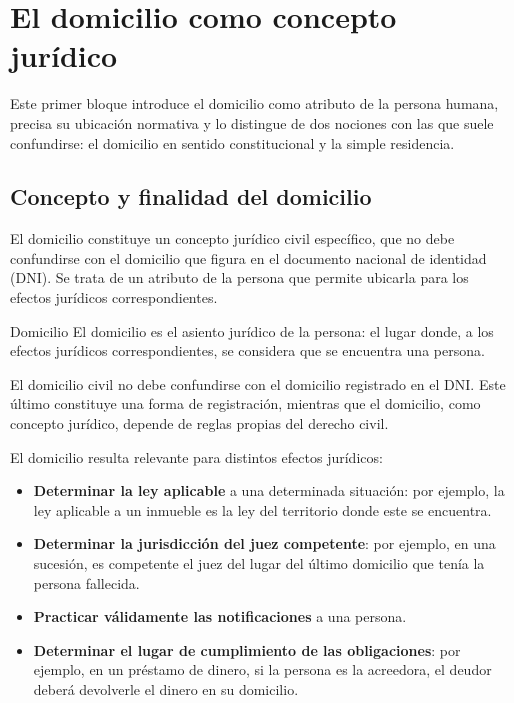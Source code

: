 \documentclass[12pt,oneside]{book}
\begin{document}

\chapter{El domicilio como concepto jurídico}

Este primer bloque introduce el domicilio como atributo de la persona humana, precisa su ubicación normativa y lo distingue de dos nociones con las que suele confundirse: el domicilio en sentido constitucional y la simple residencia.

\section{Concepto y finalidad del domicilio}

El domicilio constituye un concepto jurídico civil específico, que no debe confundirse con el domicilio que figura en el documento nacional de identidad (DNI). Se trata de un atributo de la persona que permite ubicarla para los efectos jurídicos correspondientes.

\begin{definition}{Domicilio}
El domicilio es el asiento jurídico de la persona: el lugar donde, a los efectos jurídicos correspondientes, se considera que se encuentra una persona.
\end{definition}

\begin{important}
El domicilio civil no debe confundirse con el domicilio registrado en el DNI. Este último constituye una forma de registración, mientras que el domicilio, como concepto jurídico, depende de reglas propias del derecho civil.
\end{important}

El domicilio resulta relevante para distintos efectos jurídicos:

\begin{itemize}
    \item \textbf{Determinar la ley aplicable} a una determinada situación: por ejemplo, la ley aplicable a un inmueble es la ley del territorio donde este se encuentra.
    \item \textbf{Determinar la jurisdicción del juez competente}: por ejemplo, en una sucesión, es competente el juez del lugar del último domicilio que tenía la persona fallecida.
    \item \textbf{Practicar válidamente las notificaciones} a una persona.
    \item \textbf{Determinar el lugar de cumplimiento de las obligaciones}: por ejemplo, en un préstamo de dinero, si la persona es la acreedora, el deudor deberá devolverle el dinero en su domicilio.
\end{itemize}
\end{document}
